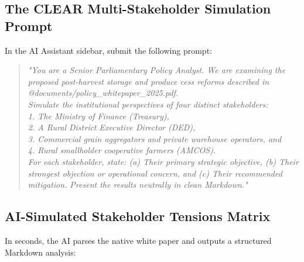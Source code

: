 \documentclass[11pt, a4paper]{report}
\begin{document}
\subsection{The CLEAR Multi-Stakeholder Simulation Prompt}
In the AI Assistant sidebar, submit the following prompt:
\begin{quote}
\small
\textit{"You are a Senior Parliamentary Policy Analyst. We are examining the proposed post-harvest storage and produce cess reforms described in @documents/policy\_whitepaper\_2025.pdf. \\
Simulate the institutional perspectives of four distinct stakeholders: \\
1. The Ministry of Finance (Treasury), \\
2. A Rural District Executive Director (DED), \\
3. Commercial grain aggregators and private warehouse operators, and \\
4. Rural smallholder cooperative farmers (AMCOS). \\
For each stakeholder, state: (a) Their primary strategic objective, (b) Their strongest objection or operational concern, and (c) Their recommended mitigation. Present the results neutrally in clean Markdown."}
\end{quote}

\subsection{AI-Simulated Stakeholder Tensions Matrix}
In seconds, the AI parses the native white paper and outputs a structured Markdown analysis:
\end{document}
